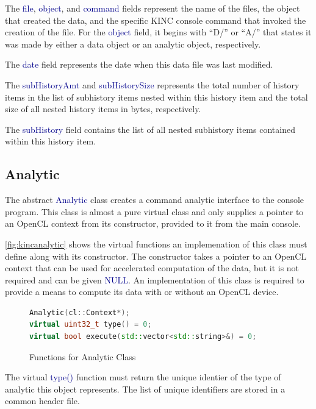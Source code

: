 \documentclass[10pt]{article}
\providecommand{\h}[1]{\textcolor{darkblue}{#1}}
\begin{document}
The \h{file}, \h{object}, and \h{command} fields represent the name of the 
files, the object that created the data, and the specific KINC console command 
that invoked the creation of the file. For the \h{object} field, it begins with 
``D/'' or ``A/'' that states it was made by either a data object or an analytic 
object, respectively.

The \h{date} field represents the date when this data file was last modified.

The \h{subHistoryAmt} and \h{subHistorySize} represents the total number of 
history items in the list of subhistory items nested within this history item 
and the total size of all nested history items in bytes, respectively.

The \h{subHistory} field contains the list of all nested subhistory items 
contained within this history item.

\subsection{Analytic}

The abstract \h{Analytic} class creates a command analytic interface to the 
console program. This class is almost a pure virtual class and only supplies a 
pointer to an OpenCL context from its constructor, provided to it from the main 
console.

\autoref{fig:kincanalytic} shows the virtual functions an implemenation of this 
class must define along with its constructor. The constructor takes a pointer 
to an OpenCL context that can be used for accelerated computation of the data, 
but it is not required and can be given \h{NULL}. An implementation of this 
class is required to provide a means to compute its data with or without an 
OpenCL device.

\begin{figure}[H]
\begin{mdframed}[style=functions]
\begin{lstlisting}[language=C++]
Analytic(cl::Context*);
virtual uint32_t type() = 0;
virtual bool execute(std::vector<std::string>&) = 0;
\end{lstlisting}
\end{mdframed}
\caption{Functions for Analytic Class}
\label{fig:kincanalytic}
\end{figure}

The virtual \h{type()} function must return the unique identier of the type of 
analytic this object represents. The list of unique identifiers are stored in a 
common header file.
\end{document}
